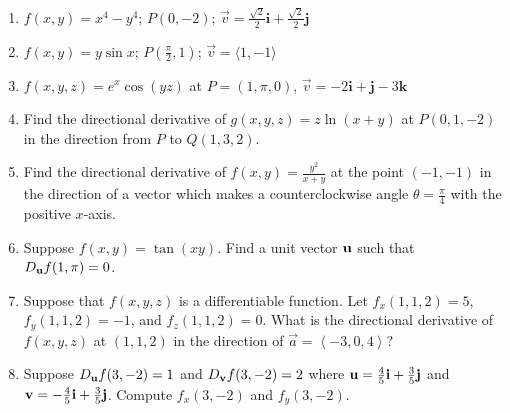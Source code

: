 \documentclass[12pt]{article}
\newif\ifans
\begin{document}
\begin{enumerate}

\item $f(x,y)=x^4-y^4$; $P(0,-2)$; $\overrightarrow{v}=\frac{\sqrt{2}}{2}\mathbf{i}+\frac{\sqrt{2}}{2}\mathbf{j}$ 

\ifans{\fbox{$\frac{32}{\sqrt{2}}$}} \fi

\item $f(x,y)=y\sin{x}$; $P\left(\frac{\pi}{2},1\right)$; $\overrightarrow{v}=\langle 1,-1 \rangle$ 

\ifans{\fbox{$-\frac{1}{\sqrt{2}}$}} \fi

\item $f(x,y,z)=e^{x}\cos{(yz)}$ at $P=(1, \pi, 0)$, $\overrightarrow{v}=-2\mathbf{i}+\mathbf{j}-3\mathbf{k}$ 

\ifans{\fbox{$-\frac{2e}{\sqrt{14}}$}} \fi

\item Find the directional derivative of $g(x,y,z)=z\ln{(x+y)}$ at $P(0,1,-2)$ in the direction from $P$ to $Q(1,3, 2)$.

\ifans{\fbox{$-\frac{6}{\sqrt{21}}$}} \fi

\item Find the directional derivative of $f(x,y)=\frac{y^2}{x+y}$ at the point $(-1,-1)$ in the direction of a vector which makes a counterclockwise angle $\theta=\frac{\pi}{4}$ with the positive $x$-axis.

\ifans{\fbox{$\frac{\sqrt{2}}{4}$}} \fi

\item Suppose $f(x,y)=\tan{(xy)}$.  Find a unit vector ${\bf u}$ such that $D_{\bf u}f(1,\pi)=0$.

\ifans{\fbox{${\bf u}=\left\langle\frac{1}{\sqrt{\pi^2+1}},-\frac{\pi}{\sqrt{\pi^2+1}}\right\rangle$ or ${\bf u}=\left\langle-\frac{1}{\sqrt{\pi^2+1}},\frac{\pi}{\sqrt{\pi^2+1}}\right\rangle$}} \fi

\item Suppose that $\displaystyle f(x,y,z)$ is a differentiable function.  Let $\displaystyle f_{x}(1,1,2)=5$, $\displaystyle f_{y}(1,1,2)=-1$, and $\displaystyle f_{z}(1,1,2)=0$.  What is the directional derivative of $\displaystyle f(x,y,z)$ at $(1,1,2)$ in the direction of $\displaystyle \overrightarrow{a}=\left \langle -3, 0, 4 \right \rangle$?

\ifans{\fbox{$-3$}} \fi

\item Suppose $D_{\bf u}f(3,-2)=1$ and $D_{\bf v}f(3,-2)=2$ where ${\bf u}=\frac{4}{5}{\bf i}+\frac{3}{5}{\bf j}$ and ${\bf v}=-\frac{4}{5}{\bf i}+\frac{3}{5}{\bf j}$. Compute $f_x(3,-2)$ and $f_y(3,-2)$.

\ifans{\fbox{$f_x(3,-2)=-\frac{5}{8}$; $f_y(3,-2)=\frac{5}{2}$ }} \fi

\end{enumerate}
\end{document}

